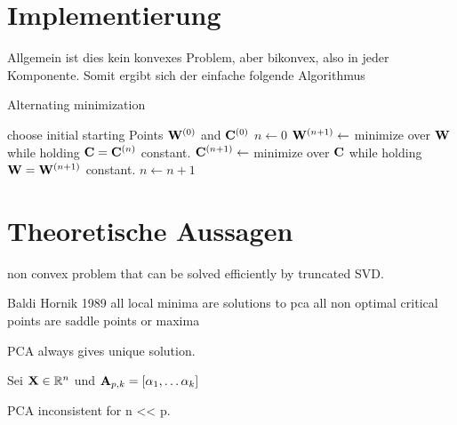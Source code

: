 \section{Implementierung}

Allgemein ist dies kein konvexes Problem, aber bikonvex, also in jeder Komponente. Somit ergibt sich der einfache folgende Algorithmus

\begin{algorithm}
    \caption{Alternating minimization}
    \label{alternating_minimization}
    \begin{algorithmic}[1]
        	\State choose initial starting Points $\mathbf{W}^{(0)}$ and $\mathbf{C}^{(0)}$
        	\State $n \gets 0$
             
                \State $\mathbf{W}^{(n+1)} \gets$ minimize over $\mathbf{W}$ while holding $\mathbf{C} = \mathbf{C}^{(n)}$ constant.
                \State $\mathbf{C}^{(n+1)} \gets$ minimize over $\mathbf{C}$ while holding $\mathbf{W} = \mathbf{W}^{(n+1)}$ constant.
                \State $n \gets n+1$
            \EndWhile
        \EndProcedure
    \end{algorithmic}
\end{algorithm} 


\section{Theoretische Aussagen}

non convex problem that can be solved efficiently by truncated SVD.

Baldi Hornik 1989
all local minima are solutions to pca
all non optimal critical points are saddle points or maxima

\begin{thm}
PCA always gives unique solution.
\end{thm}

\begin{thm}
Sei $\mathbf{X} \in \mathbb{R}^n$ und $\mathbf{A}_{p,k} = [\alpha_1, \ldots \alpha_k] $   
\end{thm}

\begin{thm}
PCA inconsistent for n << p.
\end{thm}

